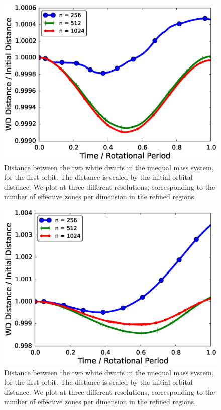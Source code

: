 \documentclass[12pt]{article}
\begin{document}
\begin{figure}[h!]
  \centering
  \includegraphics[scale=0.8,trim=0.1in 0.0in 0.1in 0.2in,clip]{plots/spatial_convergence_rot0}
  \caption[Distance between two unequal mass white dwarfs, inertial frame]
          {Distance between the two white dwarfs in the unequal mass system, for the first orbit.
           The distance is scaled by the initial orbital distance. 
           We plot at three different resolutions, corresponding to the number of 
           effective zones per dimension in the refined regions.
           \label{fig:unequal_spatial_convergence_inertial}}
\end{figure}

\begin{figure}[h!]
  \centering
  \includegraphics[scale=0.8,trim=0.1in 0.0in 0.1in 0.2in,clip]{plots/spatial_convergence_rot1}
  \caption[Distance between two unequal mass white dwarfs, rotating frame]
          {Distance between the two white dwarfs in the unequal mass system, for the first orbit.
           The distance is scaled by the initial orbital distance. 
           We plot at three different resolutions, corresponding to the number of 
           effective zones per dimension in the refined regions.
           \label{fig:unequal_spatial_convergence_rotating}}
\end{figure}
\end{document}
